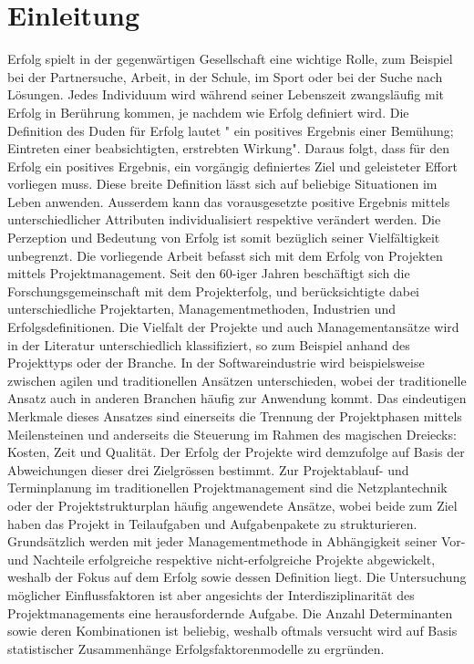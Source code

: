\section{Einleitung}
Erfolg spielt in der gegenwärtigen Gesellschaft eine wichtige Rolle, zum Beispiel bei der Partnersuche, Arbeit, in der Schule, im Sport oder bei der Suche nach Lösungen. Jedes Individuum wird während seiner Lebenszeit zwangsläufig mit Erfolg in Berührung kommen, je nachdem wie Erfolg definiert wird. Die Definition des Duden für Erfolg lautet " ein positives Ergebnis einer Bemühung; Eintreten einer beabsichtigten, erstrebten Wirkung". Daraus folgt, dass für den Erfolg ein positives Ergebnis, ein vorgängig definiertes Ziel und geleisteter Effort vorliegen muss. Diese breite Definition lässt sich auf beliebige Situationen im Leben anwenden. Ausserdem kann das vorausgesetzte positive Ergebnis mittels unterschiedlicher Attributen individualisiert respektive verändert werden. Die Perzeption und Bedeutung von Erfolg ist somit bezüglich seiner Vielfältigkeit unbegrenzt.
\newline\newline Die vorliegende Arbeit befasst sich mit dem Erfolg von Projekten mittels Projektmanagement. Seit den 60-iger Jahren beschäftigt sich die Forschungsgemeinschaft mit dem Projekterfolg, und berücksichtigte dabei unterschiedliche Projektarten, Managementmethoden, Industrien und Erfolgsdefinitionen. Die Vielfalt der Projekte und auch Managementansätze  wird in der Literatur unterschiedlich klassifiziert, so zum Beispiel anhand des Projekttyps oder der Branche. In der Softwareindustrie wird beispielsweise zwischen agilen und traditionellen Ansätzen unterschieden, wobei der traditionelle Ansatz auch in anderen Branchen häufig zur Anwendung kommt. Das eindeutigen Merkmale dieses Ansatzes sind einerseits die Trennung der Projektphasen mittels Meilensteinen und anderseits die Steuerung im Rahmen des magischen Dreiecks: Kosten, Zeit und Qualität. Der Erfolg der Projekte wird demzufolge auf Basis der Abweichungen dieser drei Zielgrössen bestimmt. Zur Projektablauf- und Terminplanung im traditionellen Projektmanagement sind die Netzplantechnik oder der Projektstrukturplan häufig angewendete Ansätze, wobei beide zum Ziel haben das Projekt in Teilaufgaben und Aufgabenpakete zu strukturieren. Grundsätzlich werden mit jeder Managementmethode in Abhängigkeit seiner Vor- und Nachteile erfolgreiche respektive nicht-erfolgreiche Projekte abgewickelt, weshalb der Fokus auf dem Erfolg sowie dessen Definition liegt. Die Untersuchung möglicher Einflussfaktoren ist aber angesichts der Interdisziplinarität des Projektmanagements eine herausfordernde Aufgabe. Die Anzahl Determinanten sowie deren Kombinationen ist beliebig, weshalb oftmals versucht wird auf Basis statistischer Zusammenhänge Erfolgsfaktorenmodelle zu ergründen.
